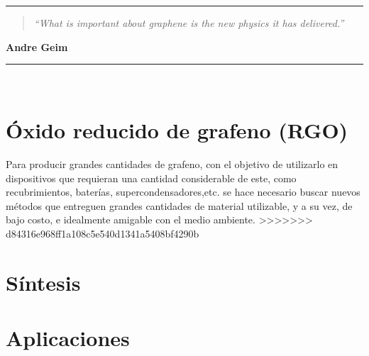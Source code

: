 \noindent
\rule{\linewidth}{1 pt}
\begin{flushright}
	\begin{quotation}
		\small{
			\textit{``What is important about graphene is the new physics it has delivered.''}}
	\end{quotation}
	\bf{Andre Geim}
\end{flushright}
\noindent
\rule{\linewidth}{1 pt}\\
\vfill

\section{Óxido reducido de grafeno (RGO)}
Para producir grandes cantidades de grafeno, con el objetivo de utilizarlo en dispositivos que requieran una cantidad considerable de este, como recubrimientos, baterías, supercondensadores,etc. se hace necesario buscar nuevos métodos que entreguen grandes cantidades de material utilizable, y a su vez, de bajo costo, e idealmente amigable con el medio ambiente. 
>>>>>>> d84316e968ff1a108c5e540d1341a5408bf4290b
\section{Síntesis}

\section{Aplicaciones}